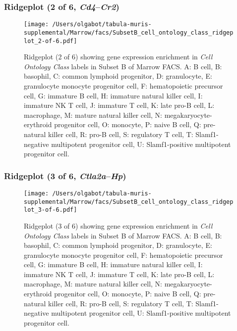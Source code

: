 \clearpage

\subsubsection{Ridgeplot (2 of 6, \emph{Cd4}--\emph{Cr2})}
\begin{figure}[h]
\centering
\texttt{[image: /Users/olgabot/tabula-muris-supplemental/Marrow/facs/SubsetB\_cell\_ontology\_class\_ridgeplot\_2-of-6.pdf]}

\caption{ Ridgeplot (2 of 6)  showing gene expression enrichment in \emph{Cell Ontology Class} labels in Subset B of Marrow FACS. A: B cell, B: basophil, C: common lymphoid progenitor, D: granulocyte, E: granulocyte monocyte progenitor cell, F: hematopoietic precursor cell, G: immature B cell, H: immature natural killer cell, I: immature NK T cell, J: immature T cell, K: late pro-B cell, L: macrophage, M: mature natural killer cell, N: megakaryocyte-erythroid progenitor cell, O: monocyte, P: naive B cell, Q: pre-natural killer cell, R: pro-B cell, S: regulatory T cell, T: Slamf1-negative multipotent progenitor cell, U: Slamf1-positive multipotent progenitor cell.}
\end{figure}


\clearpage

\subsubsection{Ridgeplot (3 of 6, \emph{Ctla2a}--\emph{Hp})}
\begin{figure}[h]
\centering
\texttt{[image: /Users/olgabot/tabula-muris-supplemental/Marrow/facs/SubsetB\_cell\_ontology\_class\_ridgeplot\_3-of-6.pdf]}

\caption{ Ridgeplot (3 of 6)  showing gene expression enrichment in \emph{Cell Ontology Class} labels in Subset B of Marrow FACS. A: B cell, B: basophil, C: common lymphoid progenitor, D: granulocyte, E: granulocyte monocyte progenitor cell, F: hematopoietic precursor cell, G: immature B cell, H: immature natural killer cell, I: immature NK T cell, J: immature T cell, K: late pro-B cell, L: macrophage, M: mature natural killer cell, N: megakaryocyte-erythroid progenitor cell, O: monocyte, P: naive B cell, Q: pre-natural killer cell, R: pro-B cell, S: regulatory T cell, T: Slamf1-negative multipotent progenitor cell, U: Slamf1-positive multipotent progenitor cell.}
\end{figure}


\clearpage

